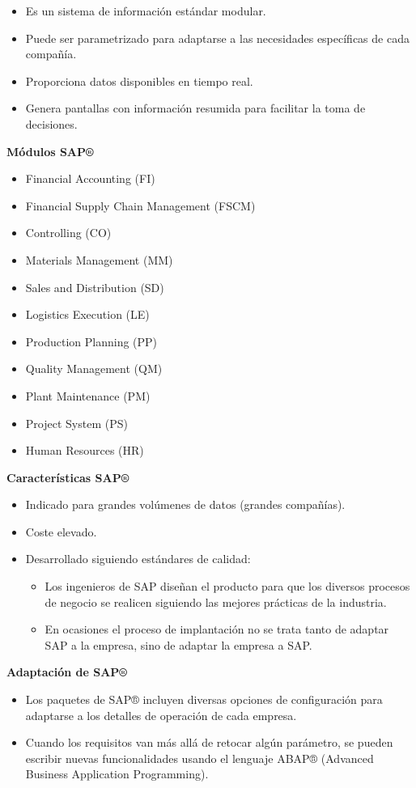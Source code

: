 \documentclass[12pt]{report} %
\begin{document}
\begin{definicion}

\begin{itemize}
    \item Es un sistema de información estándar modular.
    \item Puede ser parametrizado para adaptarse a las necesidades específicas de cada compañía.
    \item Proporciona datos disponibles en tiempo real.
    \item Genera pantallas con información resumida para facilitar la toma de decisiones.
\end{itemize}

\textbf{Módulos SAP®}

\begin{itemize}
\item Financial Accounting (FI)
\item Financial Supply Chain Management (FSCM)
\item Controlling (CO)
\item Materials Management (MM)
\item Sales and Distribution (SD)
\item Logistics Execution (LE)
\item Production Planning (PP)
\item Quality Management (QM)
\item Plant Maintenance (PM)
\item Project System (PS)
\item Human Resources (HR)
\end{itemize}

\textbf{Características SAP®}

\begin{itemize}
\item Indicado para grandes volúmenes de datos (grandes compañías).
\item Coste elevado.
\item Desarrollado siguiendo estándares de calidad:
    \begin{itemize}
    \item Los ingenieros de SAP diseñan el producto para que los diversos procesos de negocio se realicen siguiendo las mejores prácticas de la industria.
    \item En ocasiones el proceso de implantación no se trata tanto de adaptar SAP a la empresa, sino de adaptar la empresa a SAP.
    \end{itemize}
\end{itemize}

\textbf{Adaptación de SAP®}

\begin{itemize}
\item Los paquetes de SAP® incluyen diversas opciones de configuración para adaptarse a los detalles de operación de cada empresa.
\item Cuando los requisitos van más allá de retocar algún parámetro, se pueden escribir nuevas funcionalidades usando el lenguaje ABAP® (Advanced Business Application Programming).
\end{itemize}
\end{definicion}
\end{document}
